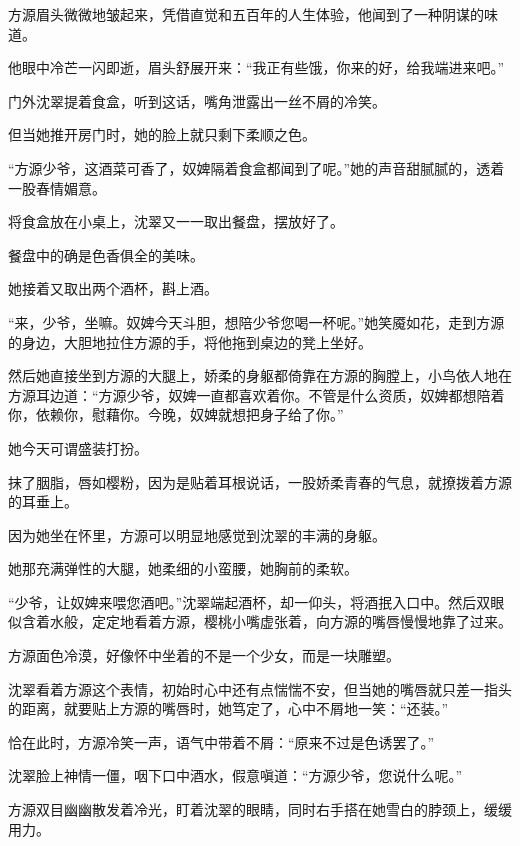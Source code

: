 
\begin{this_body}

方源眉头微微地皱起来，凭借直觉和五百年的人生体验，他闻到了一种阴谋的味道。

他眼中冷芒一闪即逝，眉头舒展开来：“我正有些饿，你来的好，给我端进来吧。”

门外沈翠提着食盒，听到这话，嘴角泄露出一丝不屑的冷笑。

但当她推开房门时，她的脸上就只剩下柔顺之色。

“方源少爷，这酒菜可香了，奴婢隔着食盒都闻到了呢。”她的声音甜腻腻的，透着一股春情媚意。

将食盒放在小桌上，沈翠又一一取出餐盘，摆放好了。

餐盘中的确是色香俱全的美味。

她接着又取出两个酒杯，斟上酒。

“来，少爷，坐嘛。奴婢今天斗胆，想陪少爷您喝一杯呢。”她笑魇如花，走到方源的身边，大胆地拉住方源的手，将他拖到桌边的凳上坐好。

然后她直接坐到方源的大腿上，娇柔的身躯都倚靠在方源的胸膛上，小鸟依人地在方源耳边道：“方源少爷，奴婢一直都喜欢着你。不管是什么资质，奴婢都想陪着你，依赖你，慰藉你。今晚，奴婢就想把身子给了你。”

她今天可谓盛装打扮。

抹了胭脂，唇如樱粉，因为是贴着耳根说话，一股娇柔青春的气息，就撩拨着方源的耳垂上。

因为她坐在怀里，方源可以明显地感觉到沈翠的丰满的身躯。

她那充满弹性的大腿，她柔细的小蛮腰，她胸前的柔软。

“少爷，让奴婢来喂您酒吧。”沈翠端起酒杯，却一仰头，将酒抿入口中。然后双眼似含着水般，定定地看着方源，樱桃小嘴虚张着，向方源的嘴唇慢慢地靠了过来。

方源面色冷漠，好像怀中坐着的不是一个少女，而是一块雕塑。

沈翠看着方源这个表情，初始时心中还有点惴惴不安，但当她的嘴唇就只差一指头的距离，就要贴上方源的嘴唇时，她笃定了，心中不屑地一笑：“还装。”

恰在此时，方源冷笑一声，语气中带着不屑：“原来不过是色诱罢了。”

沈翠脸上神情一僵，咽下口中酒水，假意嗔道：“方源少爷，您说什么呢。”

方源双目幽幽散发着冷光，盯着沈翠的眼睛，同时右手搭在她雪白的脖颈上，缓缓用力。


\end{this_body}
